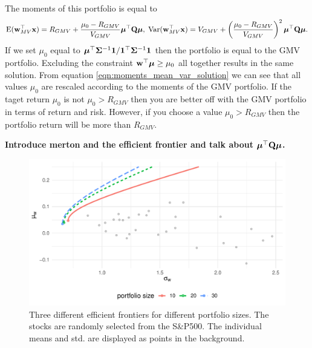 \documentclass[]{book}\usepackage{knitr}
\begin{document}
The moments of this portfolio is equal to
\begin{equation}\label{eqn:moments_mean_var_solution}
\operatorname{E}(\mathbf{w}_{MV}^\top\mathbf{x}) = R_{GMV} + \frac{\mu_0 - R_{GMV}}{V_{GMV}} \mbox{\boldmath$\mu$}^\top \mathbf{Q} \mbox{\boldmath$\mu$}, \;
\operatorname{Var}(\mathbf{w}_{MV}^\top\mathbf{x}) =V_{GMV} + \left(\frac{\mu_0 - R_{GMV}}{V_{GMV}}\right)^2 \mbox{\boldmath$\mu$}^\top \mathbf{Q} \mbox{\boldmath$\mu$}.
\end{equation}
If we set $\mu_0$ equal to $\mbox{\boldmath$\mu$}^\top \mathbf{\Sigma}^{-1} \mathbf{1} / \mathbf{1}^\top \mathbf{\Sigma}^{-1} \mathbf{1}$ then the portfolio is equal to the GMV portfolio. 
Excluding the constraint $\mathbf{w}^\top \mbox{\boldmath$\mu$} \geq \mu_0$ all together results in the same solution.
From equation \eqref{eqn:moments_mean_var_solution} we can see that all values $\mu_0$ are rescaled according to the moments of the GMV portfolio. 
If the taget return $\mu_0$ is not $\mu_0>R_{GMV}$ then you are better off with the GMV portfolio in terms of return and risk.
However, if you choose a value $\mu_0>R_{GMV}$ then the portfolio return will be more than $R_{GMV}$.

\textbf{Introduce merton and the efficient frontier and talk about $\mbox{\boldmath$\mu$}^\top \mathbf{Q} \mbox{\boldmath$\mu$}$.}
\begin{knitrout}
\color{fgcolor}\begin{figure}

{\centering \includegraphics[width=\maxwidth]{figure/mertons_efficient_frontier-1} 

}

\caption[Three different efficient frontiers for different portfolio sizes]{Three different efficient frontiers for different portfolio sizes. The stocks are randomly selected from the S\&P500. The individual means and std. are displayed as points in the background.}\label{fig:mertons_efficient_frontier}
\end{figure}

\end{knitrout}
\end{document}
